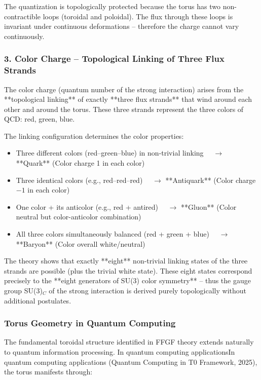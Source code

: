 The quantization is topologically protected because the torus has two non-contractible loops (toroidal and poloidal). The flux through these loops is invariant under continuous deformations – therefore the charge cannot vary continuously.

\subsubsection{3. Color Charge – Topological Linking of Three Flux Strands}

The color charge (quantum number of the strong interaction) arises from the **topological linking** of exactly **three flux strands** that wind around each other and around the torus. These three strands represent the three colors of QCD: red, green, blue.

The linking configuration determines the color properties:
\begin{itemize}
	\item Three different colors (red–green–blue) in non-trivial linking $\quad \to$ **Quark** \quad (Color charge 1 in each color)
	\item Three identical colors (e.g., red–red–red) $\quad \to$ **Antiquark** \quad (Color charge $-1$ in each color)
	\item One color + its anticolor (e.g., red + antired) $\quad \to$ **Gluon** \quad (Color neutral but color-anticolor combination)
	\item All three colors simultaneously balanced (red + green + blue) $\quad \to$ **Baryon** \quad (Color overall white/neutral)
\end{itemize}

The theory shows that exactly **eight** non-trivial linking states of the three strands are possible (plus the trivial white state). These eight states correspond precisely to the **eight generators of SU(3) color symmetry** – thus the gauge group SU(3)$_C$ of the strong interaction is derived purely topologically without additional postulates.

\subsubsection{Torus Geometry in Quantum Computing}

The fundamental toroidal structure identified in FFGF theory extends 
naturally to quantum information processing. In quantum computing 
applicationsIn quantum computing applications (Quantum Computing in T0 Framework, 2025), the torus manifests through:


